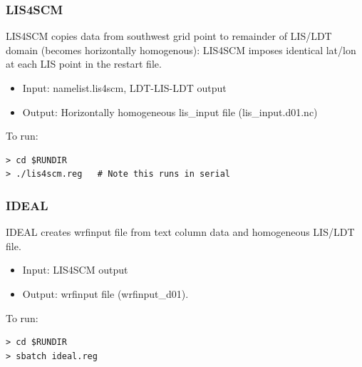 \begin{frame}[fragile]\frametitle{LIS4SCM}

\footnotesize{
LIS4SCM copies data from southwest grid point to remainder of LIS/LDT domain (becomes horizontally homogenous): LIS4SCM imposes identical lat/lon at each LIS point in the restart file.
\begin{itemize}
\item Input: namelist.lis4scm, LDT-LIS-LDT output
\item Output: Horizontally homogeneous lis\_input file (lis\_input.d01.nc)
\end{itemize}
}    
\hrulefill\par
\footnotesize{To run:}
\begin{lstlisting}
> cd $RUNDIR
> ./lis4scm.reg   # Note this runs in serial
\end{lstlisting}


\end{frame}

\begin{frame}[fragile]\frametitle{IDEAL}

\footnotesize{
IDEAL creates wrfinput file from text column data and homogeneous LIS/LDT file.
\begin{itemize}
\item Input: LIS4SCM output
\item Output: wrfinput file (wrfinput\_d01).
\end{itemize}
}    
\hrulefill\par
\footnotesize{To run:}
\begin{lstlisting}
> cd $RUNDIR
> sbatch ideal.reg
\end{lstlisting}

\end{frame}

